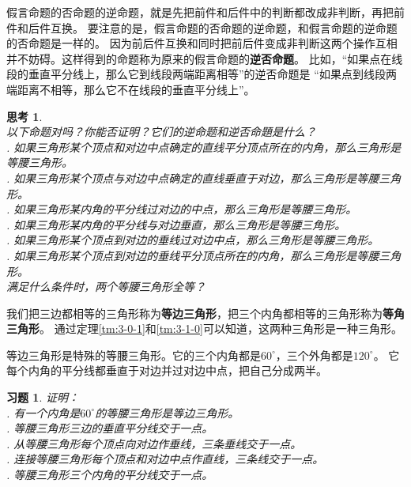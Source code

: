 \documentclass[12pt,UTF8]{ctexbook}
\newtheorem{sk}{思考}[section]
\newtheorem{xt}{习题}[section]
\begin{document}
假言命题的否命题的逆命题，就是先把前件和后件中的判断都改成非判断，再把前件和后件互换。
要注意的是，假言命题的否命题的逆命题，和假言命题的逆命题的否命题是一样的。
因为前后件互换和同时把前后件变成非判断这两个操作互相并不妨碍。这样得到的命题称为原来的假言命题的\textbf{逆否命题}。
比如，“如果点在线段的垂直平分线上，那么它到线段两端距离相等”的逆否命题是
“如果点到线段两端距离不相等，那么它不在线段的垂直平分线上”。

\begin{sk}\label{sk:4-0-0}
    \mbox{}\\
    以下命题对吗？你能否证明？它们的逆命题和逆否命題是什么？\\
    . 如果三角形某个顶点和对边中点确定的直线平分顶点所在的内角，那么三角形是等腰三角形。\\
    . 如果三角形某个顶点与对边中点确定的直线垂直于对边，那么三角形是等腰三角形。\\
    . 如果三角形某内角的平分线过对边的中点，那么三角形是等腰三角形。\\
    . 如果三角形某内角的平分线与对边垂直，那么三角形是等腰三角形。\\
    . 如果三角形某个顶点到对边的垂线过对边中点，那么三角形是等腰三角形。\\
    . 如果三角形某个顶点到对边的垂线平分顶点所在的内角，那么三角形是等腰三角形。\\
    满足什么条件时，两个等腰三角形全等？\\
\end{sk}

我们把三边都相等的三角形称为\textbf{等边三角形}，把三个内角都相等的三角形称为\textbf{等角三角形}。
通过定理\ref{tm:3-0-1}和\ref{tm:3-1-0}可以知道，这两种三角形是一种三角形。

等边三角形是特殊的等腰三角形。它的三个内角都是$60^\circ$，三个外角都是$120^\circ$。
它每个内角的平分线都垂直于对边并过对边中点，把自己分成两半。

\begin{xt}\label{xt:4-0-0}
    证明：\\
    . 有一个内角是$60^\circ$的等腰三角形是等边三角形。\\
    . 等腰三角形三边的垂直平分线交于一点。\\
    . 从等腰三角形每个顶点向对边作垂线，三条垂线交于一点。\\
    . 连接等腰三角形每个顶点和对边中点作直线，三条线交于一点。\\
    . 等腰三角形三个内角的平分线交于一点。
\end{xt}
\end{document}
